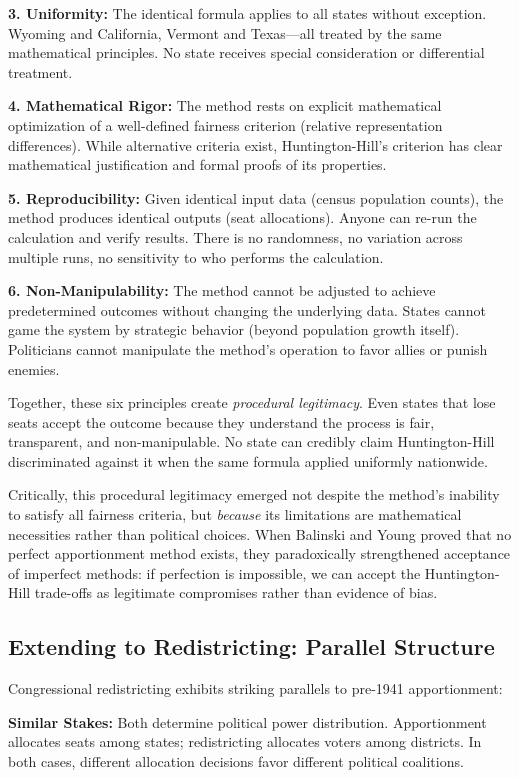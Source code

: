 \textbf{3. Uniformity:} The identical formula applies to all states without exception. Wyoming and California, Vermont and Texas—all treated by the same mathematical principles. No state receives special consideration or differential treatment.

\textbf{4. Mathematical Rigor:} The method rests on explicit mathematical optimization of a well-defined fairness criterion (relative representation differences). While alternative criteria exist, Huntington-Hill's criterion has clear mathematical justification and formal proofs of its properties.

\textbf{5. Reproducibility:} Given identical input data (census population counts), the method produces identical outputs (seat allocations). Anyone can re-run the calculation and verify results. There is no randomness, no variation across multiple runs, no sensitivity to who performs the calculation.

\textbf{6. Non-Manipulability:} The method cannot be adjusted to achieve predetermined outcomes without changing the underlying data. States cannot game the system by strategic behavior (beyond population growth itself). Politicians cannot manipulate the method's operation to favor allies or punish enemies.

Together, these six principles create \textit{procedural legitimacy}. Even states that lose seats accept the outcome because they understand the process is fair, transparent, and non-manipulable. No state can credibly claim Huntington-Hill discriminated against it when the same formula applied uniformly nationwide.

Critically, this procedural legitimacy emerged not despite the method's inability to satisfy all fairness criteria, but \textit{because} its limitations are mathematical necessities rather than political choices. When Balinski and Young proved that no perfect apportionment method exists, they paradoxically strengthened acceptance of imperfect methods: if perfection is impossible, we can accept the Huntington-Hill trade-offs as legitimate compromises rather than evidence of bias.

\subsection{Extending to Redistricting: Parallel Structure}

Congressional redistricting exhibits striking parallels to pre-1941 apportionment:

\textbf{Similar Stakes:} Both determine political power distribution. Apportionment allocates seats among states; redistricting allocates voters among districts. In both cases, different allocation decisions favor different political coalitions.

